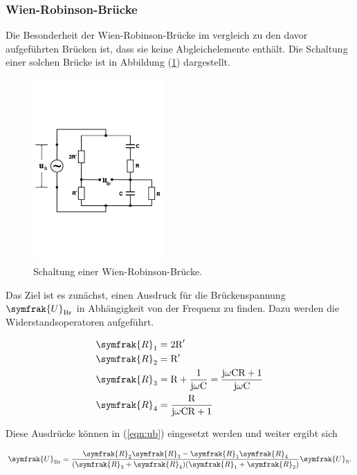 \newpage
\subsubsection{Wien-Robinson-Brücke}

\noindent
Die Besonderheit der Wien-Robinson-Brücke im vergleich zu den davor aufgeführten Brücken ist, dass sie keine Abgleichelemente enthält.
Die Schaltung einer solchen Brücke ist in Abbildung (\ref{fig:wien}) dargestellt.

\begin{figure}
            \centering
               \includegraphics[height=7cm]{wien.pdf}
               \caption{Schaltung einer Wien-Robinson-Brücke.}
               \label{fig:wien}
        \end{figure}

\noindent
Das Ziel ist es zunächst, einen Ausdruck für die Brückenspannung $\symfrak{U}_\text{Br}$ in Abhängigkeit von der Frequenz zu finden.
Dazu werden die Widerstandsoperatoren aufgeführt.

\begin{align*}
\symfrak{R}_1 &= 2\text{R}' \\
\symfrak{R}_2 &= \text{R}' \\
\symfrak{R}_3 &= \text{R} + \frac{1}{\text{j} \omega \text{C}} = \frac{\text{j} \omega \text{C} \text{R} + 1}{\text{j} \omega \text{C}} \\
\symfrak{R}_4 &= \frac{\text{R}}{\text{j} \omega \text{C} \text{R} + 1}
\end{align*}

\noindent
Diese Ausdrücke können in (\ref{eqn:ub}) eingesetzt werden und weiter ergibt sich

\begin{equation}
\symfrak{U}_\text{Br} = \frac{\symfrak{R}_2 \symfrak{R}_3 - \symfrak{R}_1 \symfrak{R}_4}{(\symfrak{R}_3 + \symfrak{R}_4)(\symfrak{R}_1 + \symfrak{R}_2)} \symfrak{U}_\text{S}  .
\end{equation}

